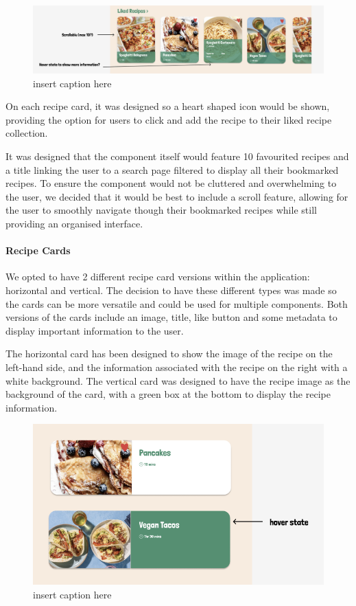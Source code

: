 \documentclass{article}
\begin{document}
\begin{figure}[htbp]
  \includegraphics[width=1.0\textwidth]{assets/Version 1 Liked Recipes.png}
  \centering
  \caption{insert caption here}
\end{figure}


On each recipe card, it was designed so a heart shaped icon would be shown, providing the option for users to click and add the recipe to their liked recipe collection.

It was designed that the component itself would feature 10 favourited recipes and a title linking the user to a search page filtered to display all their bookmarked recipes. To ensure the component would not be cluttered and overwhelming to the user, we decided that it would be best to include a scroll feature, allowing for the user to smoothly navigate though their bookmarked recipes while still providing an organised interface.

\paragraph{Recipe Cards}
We opted to have 2 different recipe card versions within the application: horizontal and vertical. The decision to have these different types was made so the cards can be more versatile and could be used for multiple components. Both versions of the cards include an image, title, like button and some metadata to display important information to the user.

The horizontal card has been designed to show the image of the recipe on the left-hand side, and the information associated with the recipe on the right with a white background. The vertical card was designed to have the recipe image as the background of the card, with a green box at the bottom to display the recipe information.

\begin{figure}[htbp]
  \includegraphics[width=1.0\textwidth]{assets/Version 1 Horizontal Cards.png}
  \centering
  \caption{insert caption here}
\end{figure}
\end{document}
